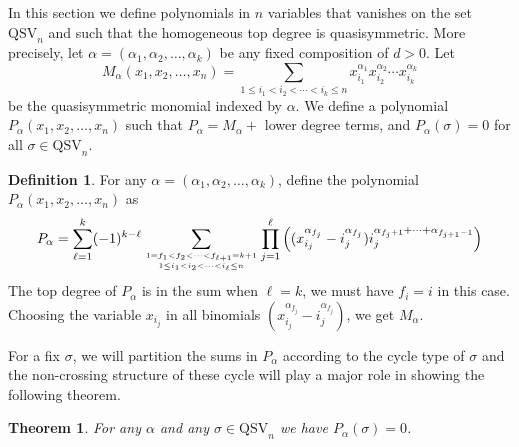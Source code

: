 \documentclass[12pt]{amsart}
\newtheorem{thm}[equation]{Theorem}
\theoremstyle{definition}
\newtheorem{definition}[equation]{Definition}
\theoremstyle{remark}
\numberwithin{equation}{section}
\newcommand{\QSV}{\mathrm{QSV}}
\begin{document}
In this section we define polynomials in $n$ variables that vanishes on the set $\QSV_n$ and such that
the homogeneous top degree is quasisymmetric. More precisely, let $\alpha=(\alpha_1,\alpha_2,\ldots,\alpha_k)$
be any fixed composition of $d>0$. Let 
	$$M_\alpha(x_1,x_2,\ldots,x_n)=\sum_{1\le i_1<i_2<\cdots<i_k\le n} x_{i_1}^{\alpha_1} x_{i_2}^{\alpha_2}\cdots  x_{i_k}^{\alpha_k}$$
be the quasisymmetric monomial indexed by $\alpha$. We  define a polynomial $P_\alpha(x_1,x_2,\ldots,x_n)$ such that
  $P_\alpha = M_\alpha +$  lower degree terms, and  $P_\alpha(\sigma)=0$  for all $\sigma\in \QSV_n$.


\begin{definition}\label{def:vanishP}
 For any $\alpha=(\alpha_1,\alpha_2,\ldots,\alpha_k)$, define the polynomial $P_\alpha(x_1,x_2,\ldots,x_n)$ as
	$$P_\alpha=\sum_{\ell=1}^k (-1)^{k-\ell} \sum_{1=f_1<f_2<\cdots <f_{\ell+1}=k+1  \atop 1\le i_1<i_2<\cdots < i_\ell\le n} \prod_{j=1}^\ell 
	      \Big( (x_{i_j}^{\alpha_{f_j}}- i_j^{\alpha_{f_j }})  i_j^{\alpha_{f_j +1}+\cdots+\alpha_{f_{j +1}-1}} \Big)
	      $$
	      The top degree of $P_\alpha$ is in the sum when $\ell=k$, we must have $f_i=i$ in this case. Choosing the variable $x_{i_j}$ in all binomials $(x_{i_j}^{\alpha_{f_j}}- i_j^{\alpha_{f_j }})$, we get $M_\alpha$.
\end{definition}
	      
For a fix $\sigma$, we will partition the sums in $P_\alpha$ according to the cycle type of $\sigma$ and the non-crossing structure
of these cycle will play a major role in showing the following theorem.

\begin{thm}\label{thm:vanishing}
 For any $\alpha$ and any $\sigma\in \QSV_n$ we  have $P_\alpha(\sigma)=0$.
\end{thm}
\end{document}

